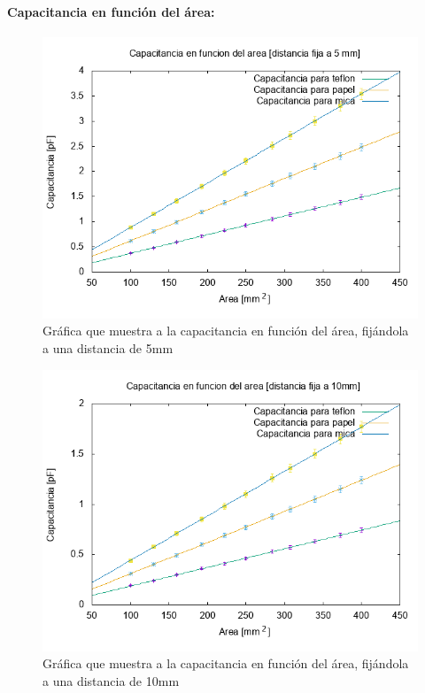 \documentclass[letterpaper, 11 pt]{article}
\begin{document}
\begin{multicols}{2}
\paragraph{Capacitancia en función del área:}
\begin{figure}[H]
    \includegraphics[scale=0.43]{CA100.png}
    \caption{Gráfica que muestra a la capacitancia en función del área, fijándola a una distancia de 5mm}
    \centering
\end{figure}
\begin{figure}[H]
    \includegraphics[scale=0.45]{CA400.png}
    \caption{Gráfica que muestra a la capacitancia en función del área, fijándola a una distancia de 10mm}
    \centering
\end{figure}


\end{multicols}
\end{document}
